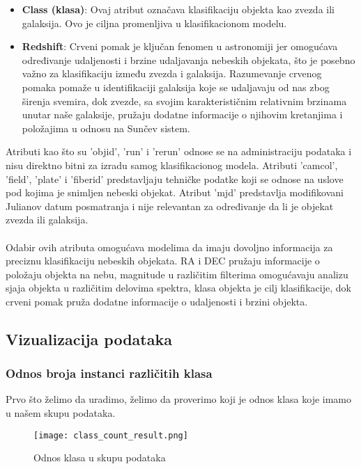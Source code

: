 \documentclass[a4paper,12pt]{article}
\begin{document}
\begin{itemize}
    \item \textbf{Class (klasa)}: Ovaj atribut označava klasifikaciju objekta kao zvezda ili galaksija. Ovo je ciljna promenljiva u klasifikacionom modelu.
    
    \item \textbf{Redshift}: Crveni pomak je ključan fenomen u astronomiji jer omogućava određivanje udaljenosti i brzine udaljavanja nebeskih objekata, što je posebno važno za klasifikaciju između zvezda i galaksija. Razumevanje crvenog pomaka pomaže u identifikaciji galaksija koje se udaljavaju od nas zbog širenja svemira, dok zvezde, sa svojim karakterističnim relativnim brzinama unutar naše galaksije, pružaju dodatne informacije o njihovim kretanjima i položajima u odnosu na Sunčev sistem.
\end{itemize}

Atributi kao što su 'objid', 'run' i 'rerun' odnose se na administraciju podataka i nisu direktno bitni za izradu samog klasifikacionog modela. Atributi 'camcol', 'field', 'plate' i 'fiberid' predstavljaju tehničke podatke koji se odnose na uslove pod kojima je snimljen nebeski objekat. Atribut 'mjd' predstavlja modifikovani Julianov datum posmatranja i nije relevantan za određivanje da li je objekat zvezda ili galaksija.\\\\
Odabir ovih atributa omogućava modelima da imaju dovoljno informacija za preciznu klasifikaciju nebeskih objekata. RA i DEC pružaju informacije o položaju objekta na nebu, magnitude u različitim filterima omogućavaju analizu sjaja objekta u različitim delovima spektra, klasa objekta je cilj klasifikacije, dok crveni pomak pruža dodatne informacije o udaljenosti i brzini objekta.

\clearpage

\subsection{Vizualizacija podataka}

\subsubsection{Odnos broja instanci različitih klasa}
Prvo što želimo da uradimo, želimo da proverimo koji je odnos klasa koje imamo u našem skupu podataka.

\begin{figure}[h!]
\centering
\texttt{[image: class\_count\_result.png]}
\caption{Odnos klasa u skupu podataka}
\label{fig:sql_query}
\end{figure}
\end{document}
